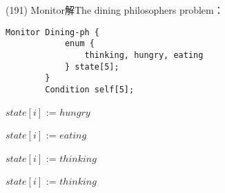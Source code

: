 \begin{theorem}{(191)} Monitor解The dining philosophers problem：
    \begin{lstlisting}[caption={Data structure (The dining philosophers problem (Monitor)).}, captionpos=b, mathescape=true]
        Monitor Dining-ph {
            enum {
                thinking, hungry, eating
            } state[5];
        } 
        Condition self[5];
    \end{lstlisting}
    \begin{algorithm}[H]
        \caption{$pickup(i)$.}
        \begin{algorithmic}[1]
                \State $state[i]$ := $hungry$
                \State {}
                    \State {}
                \EndIf
            \EndFunction
        \end{algorithmic}
    \end{algorithm}
    \begin{algorithm}[H]
        \caption{$test(i)$.}
        \begin{algorithmic}[1]
                    \State $state[i]$ := $eating$
                    \State {}
                \EndIf
            \EndFunction
        \end{algorithmic}
    \end{algorithm}
    \begin{algorithm}[H]
        \caption{$putdown(i)$.}
        \begin{algorithmic}[1]
                \State $state[i]$ := $thinking$
                \State {}
                \State {}
            \EndFunction
        \end{algorithmic}
    \end{algorithm}
    \begin{algorithm}[H]
        \caption{$initialization\_code()$.}
        \begin{algorithmic}[1]
             
                    \State $state[i]$ := $thinking$
                \EndFor
            \EndFunction
        \end{algorithmic}

\end{algorithm}
\end{theorem}
